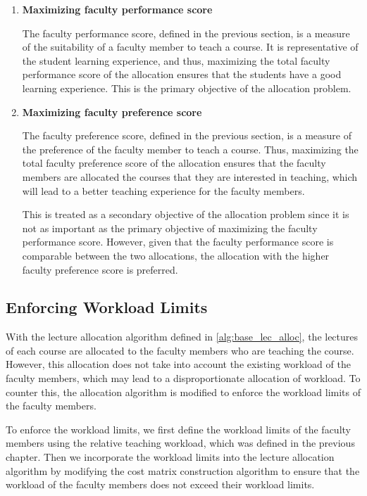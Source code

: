 \begin{enumerate}
  \item \textbf{Maximizing faculty performance score}

        The faculty performance score, defined in the previous section, is a measure of the suitability of a faculty member to teach a course. It is representative of the student learning experience, and thus, maximizing the total faculty performance score of the allocation ensures that the students have a good learning experience. This is the primary objective of the allocation problem.

  \item \textbf{Maximizing faculty preference score}

        The faculty preference score, defined in the previous section, is a measure of the preference of the faculty member to teach a course. Thus, maximizing the total faculty preference score of the allocation ensures that the faculty members are allocated the courses that they are interested in teaching, which will lead to a better teaching experience for the faculty members.

        This is treated as a secondary objective of the allocation problem since it is not as important as the primary objective of maximizing the faculty performance score. However, given that the faculty performance score is comparable between the two allocations, the allocation with the higher faculty preference score is preferred.

\end{enumerate}

\subsection{Enforcing Workload Limits}

With the lecture allocation algorithm defined in \autoref{alg:base_lec_alloc}, the lectures of each course are allocated to the faculty members who are teaching the course. However, this allocation does not take into account the existing workload of the faculty members, which may lead to a disproportionate allocation of workload. To counter this, the allocation algorithm is modified to enforce the workload limits of the faculty members.

To enforce the workload limits, we first define the workload limits of the faculty members using the relative teaching workload, which was defined in the previous chapter. Then we incorporate the workload limits into the lecture allocation algorithm by modifying the cost matrix construction algorithm to ensure that the workload of the faculty members does not exceed their workload limits.

